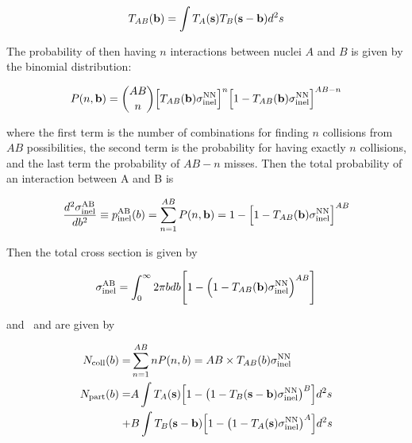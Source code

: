 \begin{align}
T_{AB}({\bf b}) = \int T_{A} ({\bf s}) T_{B} ({\bf s-\bf b}) d^2 s
\end{align}

The probability of then having $n$ interactions between nuclei $A$ and $B$ is given by the binomial distribution:

\begin{align}
P(n, { \bf b}) = {{AB} \choose {n}} \Big[T_{AB}( {\bf b} ) \sigma_{\mathrm{inel}}^{\mathrm{NN}} \Big]^n \Big[ 1 - T_{AB}( {\bf b} ) \sigma_{\mathrm{inel}}^{\mathrm{NN}} \Big]^{AB-n}
\end{align}

where the first term is the number of combinations for finding $n$ collisions from $AB$ possibilities, the second term is the probability for having exactly $n$ collisions, and the last term the probability of $AB-n$ misses. Then the total probability of an interaction between A and B is 


\begin{align}
\frac{d^2  \sigma_{\mathrm{inel}}^{\mathrm{AB}} }{db^2} \equiv p_{\mathrm{inel}}^{\mathrm{AB}} (b) = \sum_{n=1}^{AB} P(n, {\bf b}) = 1- \Big[ 1 - T_{AB}( {\bf b} ) \sigma_{\mathrm{inel}}^{\mathrm{NN}} \Big]^{AB}
\end{align}

Then the total cross section is given by

\begin{align}
\sigma_{\mathrm{inel}}^{\mathrm{AB}} = \int_0^\infty 2\pi b db \Bigg[ 1- \Big( 1 - T_{AB}( {\bf b} ) \sigma_{\mathrm{inel}}^{\mathrm{NN}}  \Big)^{AB} \Bigg]
\end{align}

and \Ncoll\ and \Npart are given by \cite{Kharzeev:2000ph, Bialas:1976ed}

\begin{align}
\mbox{$N_{\mathrm{coll}}$} (b) = & \sum_{n=1}^{AB} n P(n, b) =  AB \times T_{AB}(b) \sigma_{\mathrm{inel}}^{\mathrm{NN}} \\
\mbox{$N_{\mathrm{part}}$} (b) = & A \int T_A ({\bf s}) \Big[ 1 - \big(1-T_B ({\bf s - b}) \sigma_{\mathrm{inel}}^{\mathrm{NN}} \big)^B \Big] d^2 s \\
+ & B \int T_B ({\bf s-b}) \Big[ 1 - \big(1-T_A ({\bf s}) \sigma_{\mathrm{inel}}^{\mathrm{NN}} \big)^A \Big] d^2 s \nonumber
\end{align}

